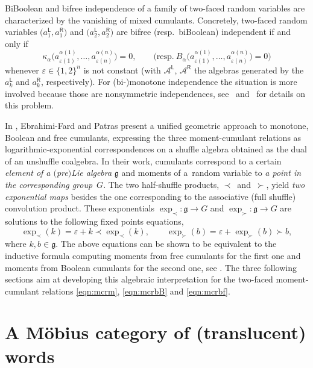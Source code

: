 \documentclass[pdftex]{sigma}
\newcommand\LL{{\mathsf{L}}}
\newcommand\RR{{\mathsf{R}}}
\numberwithin{equation}{section}
\begin{document}
BiBoolean and bifree independence of a family of two-faced random variables are characterized by the vanishing of mixed cumulants. Concretely, two-faced random variables $\big(a^{\LL}_1, a^{\RR}_1\big)$ and $\big(a^{\LL}_2, a^{\RR}_2\big)$ are bifree (resp.\ biBoolean) independent if and only if
\[
\kappa_{\alpha}\big(a_{\varepsilon(1)}^{\alpha(1)},\dots,a^{\alpha(n)}_{\varepsilon(n)}\big) = 0, \qquad \big(\text{resp.} \ B_{\alpha}\big(a_{\varepsilon(1)}^{\alpha(1)},\dots,a^{\alpha(n)}_{\varepsilon(n)}\big)=0\big)
\]
whenever $\varepsilon\in\{1,2\}^n$ is not constant (with $\mathcal A^\LL$, $\mathcal A^\RR$ the algebras generated by the $a_k^\LL$ and $a_k^\RR$, respectively). For (bi-)monotone independence the situation is more involved because those are nonsymmetric independences, see~\cite{ManzelSchurmann17} and~\cite{HasebeLehner2017p} for details on this problem.

In \cite{ebrahimi2015cumulants}, Ebrahimi-Fard and Patras present a unified geometric approach to monotone, Boolean and free cumulants, expressing the three moment-cumulant relations as logarithmic-exponential correspondences on a shuffle algebra obtained as the dual of an unshuffle coalgebra.
In their work, cumulants correspond to a certain \emph{element of a $($pre$)$Lie algebra} $\mathfrak{g}$ and moments of a~random variable to \emph{a point in the corresponding group}~$G$.
The two half-shuffle products, $\prec$~and~$\succ$, yield \emph{two exponential maps} besides the one corresponding to the associative (full shuffle) convolution product.
These exponentials $\exp_{\prec}\colon \mathfrak{g}\to G$ and $\exp_{\succ}\colon \mathfrak{g}\to G$ are solutions to the following fixed points equations,
\begin{equation*}
	\exp_{\prec}(k) = \varepsilon + k \prec \exp_{\prec}(k),\qquad \exp_{\succ}(b) = \varepsilon + \exp_{\succ}(b) \succ b,
\end{equation*}
where $k,b \in \mathfrak g$. The above equations can be shown to be equivalent to the inductive formula computing moments from free cumulants for the first one and moments from Boolean cumulants for the second one, see \cite{EbrahimiFardPatras2019applications}. The three following sections aim at developing this algebraic interpretation for the two-faced moment-cumulant relations \eqref{eqn:mcrm}, \eqref{eqn:mcrbB} and \eqref{eqn:mcrbf}.

\section{A M\"obius category of (translucent) words}\label{sec:categoryofwords}
\end{document}
